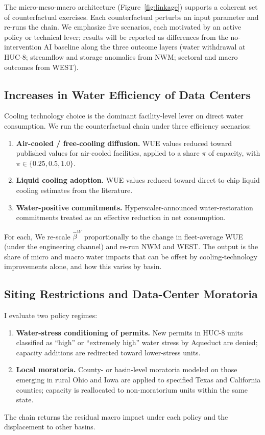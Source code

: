 \documentclass[11pt, letterpaper]{article}
\begin{document}
The micro-meso-macro architecture (Figure~\ref{fig:linkage}) supports a coherent set of counterfactual exercises. Each counterfactual perturbs an input parameter and re-runs the chain. We emphasize five scenarios, each motivated by an active policy or technical lever; results will be reported as differences from the no-intervention AI baseline along the three outcome layers (water withdrawal at HUC-8; streamflow and storage anomalies from NWM; sectoral and macro outcomes from WEST).

\subsection{Increases in Water Efficiency of Data Centers}
\label{sec:cf_efficiency}

Cooling technology choice is the dominant facility-level lever on direct water consumption. We run the counterfactual chain under three efficiency scenarios:
\begin{enumerate}[label=(\roman*)]
\item \textbf{Air-cooled / free-cooling diffusion.} WUE values reduced toward published values for air-cooled facilities, applied to a share $\pi$ of capacity, with $\pi \in \{0.25, 0.5, 1.0\}$.
\item \textbf{Liquid cooling adoption.} WUE values reduced toward direct-to-chip liquid cooling estimates from the literature.
\item \textbf{Water-positive commitments.} Hyperscaler-announced water-restoration commitments treated as an effective reduction in net consumption.
\end{enumerate}
For each, We re-scale $\widehat{\beta}^{W}$ proportionally to the change in fleet-average WUE (under the engineering channel) and re-run NWM and WEST. The output is the share of micro and macro water impacts that can be offset by cooling-technology improvements alone, and how this varies by basin.

\subsection{Siting Restrictions and Data-Center Moratoria}
\label{sec:cf_siting}

I evaluate two policy regimes:
\begin{enumerate}[label=(\roman*)]
\item \textbf{Water-stress conditioning of permits.} New permits in HUC-8 units classified as ``high'' or ``extremely high'' water stress by Aqueduct are denied; capacity additions are redirected toward lower-stress units.
\item \textbf{Local moratoria.} County- or basin-level moratoria modeled on those emerging in rural Ohio and Iowa \citep{OhioSignal2025,WFMJ2025} are applied to specified Texas and California counties; capacity is reallocated to non-moratorium units within the same state.
\end{enumerate}
The chain returns the residual macro impact under each policy and the displacement to other basins.
\end{document}
